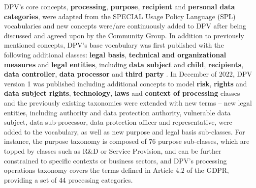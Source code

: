 DPV's core concepts, \textbf{processing}, \textbf{purpose}, \textbf{recipient} and \textbf{personal data categories}, were adapted from the SPECIAL Usage Policy Language (SPL) vocabularies \citep{bonatti_policy_2018} and new concepts were/are continuously added to DPV after being discussed and agreed upon by the Community Group.
In addition to previously mentioned concepts, DPV's base vocabulary was first published with the following additional classes: \textbf{legal basis}, \textbf{technical and organizational measures} and \textbf{legal entities}, including \textbf{data subject} and \textbf{child}, \textbf{recipients}, \textbf{data controller}, \textbf{data processor} and \textbf{third party} \citep{panetto_creating_2019}.
In December of 2022, DPV version 1 was published including additional concepts to model \textbf{risk}, \textbf{rights} and \textbf{data subject rights}, \textbf{technology}, \textbf{laws} and \textbf{context of processing} classes and the previously existing taxonomies were extended with new terms -- new legal entities, including authority and data protection authority, vulnerable data subject, data sub-processor, data protection officer and representative, were added to the vocabulary, as well as new purpose and legal basis sub-classes.
For instance, the purpose taxonomy is composed of 76 purpose sub-classes, which are topped by classes such as R\&D or Service Provision, and can be further constrained to specific contexts or business sectors, and DPV's processing operations taxonomy covers the terms defined in Article 4.2 of the GDPR, providing a set of 44 processing categories.

